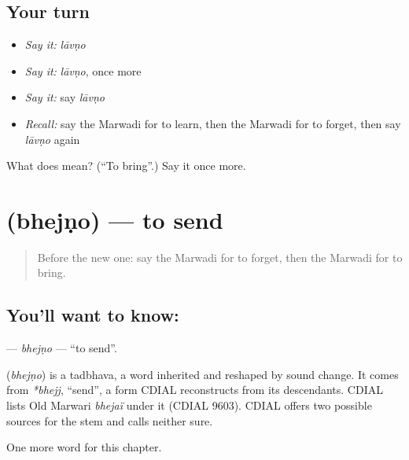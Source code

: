 \subsection*{Your turn}
\begin{itemize}
\raggedright
  \item \emph{Say it:} \emph{lāvṇo}
  \item \emph{Say it:} \emph{lāvṇo}, once more
  \item \emph{Say it:} say \emph{lāvṇo}
  \item \emph{Recall:} say the Marwadi for to learn, then the Marwadi for to forget, then say \emph{lāvṇo} again
\end{itemize}

\begin{tcolorbox}[breakable,colback=teal!4,colframe=teal!35!black,title={Before you move on}]
What does  mean? (\textquotedblleft{}To bring\textquotedblright{}.) Say it once more.
\end{tcolorbox}
\section[\texorpdfstring{\mw{भेजणो} (bhejṇo)}{भेजणो (bhejṇo)}]{ (bhejṇo) — to send}

\label{lesson:MW-C55-bhejno}



\begin{quote}
Before the new one: say the Marwadi for to forget, then the Marwadi for to bring.
\end{quote}

\subsection*{You'll want to know: }
\textbf{} — \emph{bhejṇo} — \textquotedblleft{}to send\textquotedblright{}.

\begin{cousinweb}
\textbf{} (\emph{bhejṇo}) is a tadbhava, a word inherited and reshaped by sound change. It comes from \emph{*bhejj}, \textquotedblleft{}send\textquotedblright{}, a form CDIAL reconstructs from its descendants. CDIAL lists Old Marwari \emph{bhejaï} under it (CDIAL 9603). CDIAL offers two possible sources for the stem and calls neither sure.
\end{cousinweb}

\begin{grammarlens}[title={What you've built}]
One more word for this chapter.
\end{grammarlens}

